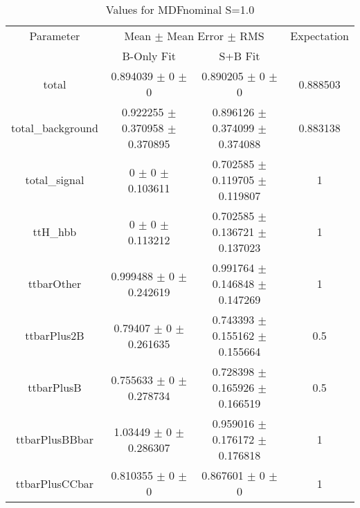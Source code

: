 \begin{table}
\centering
\caption{Values for MDFnominal S=1.0}
\begin{tabular}{cccc}
\toprule
Parameter & \multicolumn{2}{c}{Mean $\pm$ Mean Error $\pm$ RMS} & Expectation\\
 & B-Only Fit & S+B Fit & \\
\midrule
total & \num{0.894039} $\pm$ \num{0} $\pm$ \num{0} & \num{0.890205} $\pm$ \num{0} $\pm$ \num{0} & \num{0.888503}\\
total\_background & \num{0.922255} $\pm$ \num{0.370958} $\pm$ \num{0.370895} & \num{0.896126} $\pm$ \num{0.374099} $\pm$ \num{0.374088} & \num{0.883138}\\
total\_signal & \num{0} $\pm$ \num{0} $\pm$ \num{0.103611} & \num{0.702585} $\pm$ \num{0.119705} $\pm$ \num{0.119807} & \num{1}\\
ttH\_hbb & \num{0} $\pm$ \num{0} $\pm$ \num{0.113212} & \num{0.702585} $\pm$ \num{0.136721} $\pm$ \num{0.137023} & \num{1}\\
ttbarOther & \num{0.999488} $\pm$ \num{0} $\pm$ \num{0.242619} & \num{0.991764} $\pm$ \num{0.146848} $\pm$ \num{0.147269} & \num{1}\\
ttbarPlus2B & \num{0.79407} $\pm$ \num{0} $\pm$ \num{0.261635} & \num{0.743393} $\pm$ \num{0.155162} $\pm$ \num{0.155664} & \num{0.5}\\
ttbarPlusB & \num{0.755633} $\pm$ \num{0} $\pm$ \num{0.278734} & \num{0.728398} $\pm$ \num{0.165926} $\pm$ \num{0.166519} & \num{0.5}\\
ttbarPlusBBbar & \num{1.03449} $\pm$ \num{0} $\pm$ \num{0.286307} & \num{0.959016} $\pm$ \num{0.176172} $\pm$ \num{0.176818} & \num{1}\\
ttbarPlusCCbar & \num{0.810355} $\pm$ \num{0} $\pm$ \num{0} & \num{0.867601} $\pm$ \num{0} $\pm$ \num{0} & \num{1}\\
\bottomrule
\end{tabular}
\end{table}